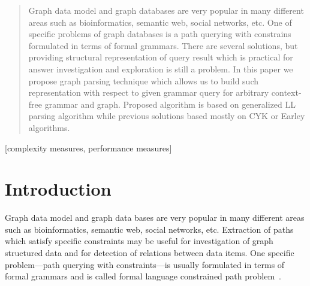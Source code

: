 \documentclass{sig-alternate} %
\begin{document}
\begin{abstract}
Graph data model and graph databases are very popular in many 
different areas such as bioinformatics, semantic web, social networks, etc. 
One of specific problems of graph databases is a path querying with constrains 
formulated in terms of formal grammars. There are several solutions, but
providing structural representation of query result which is practical for 
answer investigation and exploration is still a problem. 
In this paper we propose graph parsing technique which allows us to build such representation with respect to given grammar query for arbitrary context-free grammar and graph.
Proposed algorithm is based on generalized LL parsing algorithm while previous solutions based mostly on CYK or Earley algorithms.

\end{abstract}


[complexity measures, performance measures]



\section{Introduction}
Graph data model and graph data bases are very popular in many different areas such as bioinformatics, semantic web, social networks, etc.
Extraction of paths which satisfy specific constraints may be useful for investigation of graph structured data and for detection of relations between data items.
One specific problem---path querying with constraints---is usually formulated in terms of formal grammars and is called formal language constrained path problem~\cite{FLCpathProblem}.

\end{document}
